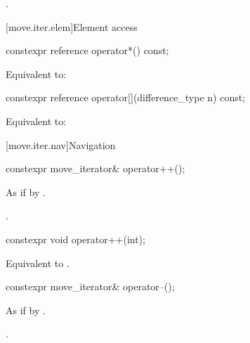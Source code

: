 \begin{itemdescr}
\pnum
\returns
{}.
\end{itemdescr}

[move.iter.elem]{Element access}

%
\begin{itemdecl}
constexpr reference operator*() const;
\end{itemdecl}

\begin{itemdescr}
\pnum
\effects
Equivalent to: 
\end{itemdescr}

%
\begin{itemdecl}
constexpr reference operator[](difference_type n) const;
\end{itemdecl}

\begin{itemdescr}
\pnum
\effects
Equivalent to: 
\end{itemdescr}

[move.iter.nav]{Navigation}

%
\begin{itemdecl}
constexpr move_iterator& operator++();
\end{itemdecl}

\begin{itemdescr}
\pnum
\effects
As if by .

\pnum
\returns
{}.
\end{itemdescr}

%
\begin{itemdecl}
constexpr void operator++(int);
\end{itemdecl}

\begin{itemdescr}
\pnum
\effects
Equivalent to .
\end{itemdescr}

%
\begin{itemdecl}
constexpr move_iterator& operator--();
\end{itemdecl}

\begin{itemdescr}
\pnum
\effects
As if by .

\pnum
\returns
{}.
\end{itemdescr}

